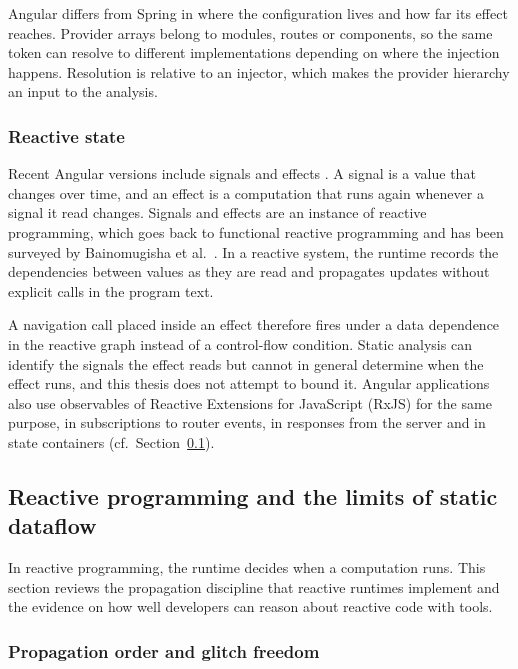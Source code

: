 Angular differs from Spring in where the configuration lives and how far its effect reaches.
Provider arrays belong to modules, routes or components, so the same token can resolve to
different implementations depending on where the injection happens. Resolution is relative to an
injector, which makes the provider hierarchy an input to the analysis.

\subsubsection{Reactive state}
\label{sec:signals}

Recent Angular versions include signals and effects \cite{angulareffects}. A signal is a value
that changes over time, and an effect is a computation that runs again whenever a signal it read
changes. Signals and effects are an instance of reactive programming, which goes back to
functional reactive programming \cite{elliott1997frp} and has been surveyed by Bainomugisha et
al.\ \cite{bainomugisha2013survey}. In a reactive system, the runtime records the dependencies
between values as they are read and propagates updates without explicit calls in the program
text.

A navigation call placed inside an effect therefore fires under a data dependence in the reactive
graph instead of a control-flow condition. Static analysis can identify the signals the effect
reads but cannot in general determine when the effect runs, and this thesis does not attempt to
bound it. Angular applications also use observables of Reactive Extensions for JavaScript (RxJS)
for the same purpose, in subscriptions to router events, in responses from the server and in
state containers (cf.~Section~\ref{sec:reactive}).

\subsection{Reactive programming and the limits of static dataflow}
\label{sec:reactive}

In reactive programming, the runtime decides when a computation runs. This section reviews the
propagation discipline that reactive runtimes implement and the evidence on how well developers
can reason about reactive code with tools.

\subsubsection{Propagation order and glitch freedom}

